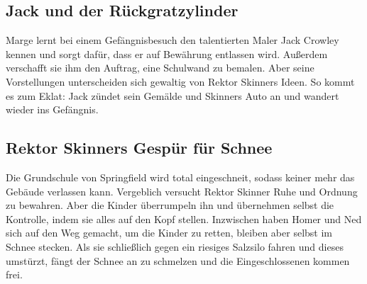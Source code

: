 

\subsection{Jack und der Rückgratzylinder}
Marge lernt bei einem Gefängnisbesuch den talentierten Maler Jack Crowley kennen und sorgt dafür, dass er auf Bewährung entlassen wird. Außerdem verschafft sie ihm den Auftrag, eine Schulwand zu bemalen. Aber seine Vorstellungen unterscheiden sich gewaltig von Rektor Skinners Ideen. So kommt es zum Eklat: Jack zündet sein Gemälde und Skinners Auto an und wandert wieder ins Gefängnis.


\subsection{Rektor Skinners Gespür für Schnee}\label{CABF06}
Die Grundschule von Springfield wird total eingeschneit, sodass keiner mehr das Gebäude verlassen kann. Vergeblich versucht Rektor Skinner Ruhe und Ordnung zu bewahren. Aber die Kinder überrumpeln ihn und übernehmen selbst die Kontrolle, indem sie alles auf den Kopf stellen. Inzwischen haben Homer und Ned sich auf den Weg gemacht, um die Kinder zu retten, bleiben aber selbst im Schnee stecken. Als sie schließlich gegen ein riesiges Salzsilo fahren und dieses umstürzt, fängt der Schnee an zu schmelzen und die Eingeschlossenen kommen frei.

